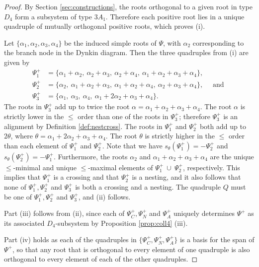 \documentclass[11pt]{amsart}
\theoremstyle{plain}
\theoremstyle{definition}
\theoremstyle{remark}
\numberwithin{equation}{subsection}
\newcommand{\al}{\alpha}
\begin{document}
\begin{proof}
By Section \ref{sec:constructions}, the roots orthogonal to a given root in type
$D_4$ form a subsystem of type $3A_1$. Therefore each positive root lies in a
unique quadruple of mutually orthogonal positive roots, which proves (i).

Let $\{\al_1,\al_2,\al_3,\al_4\}$ be the induced simple roots of $\Psi$, with
$\al_2$ corresponding to the branch node in the Dynkin diagram.  Then the three
quadruples from (i) are given by \begin{align*} \Psi^+_1 &= \{\al_1 + \al_2, \
    \al_2 + \al_3, \ \al_2 + \al_4, \ \al_1 + \al_2 + \al_3 + \al_4\}, \\
    \Psi^+_2 &= \{\al_2, \ \al_1 + \al_2 + \al_3, \ \al_1 + \al_2 + \al_4, \
    \al_2 + \al_3 + \al_4\}, \quad \text{\ and\ }\\ \Psi^+_3 &= \{\al_1, \
    \al_3, \ \al_4, \ \al_1 + 2\al_2 + \al_3 + \al_4\} .
\end{align*} The roots in $\Psi^+_3$ add up to twice the root $\al = \al_1 +
    \al_2 + \al_3 + \al_4$. The root $\al$ is strictly lower in the $\le$ order
    than one of the roots in $\Psi^+_3$; therefore $\Psi^+_3$ is an alignment by
    Definition \ref{def:nestcross}.  The roots in $\Psi^+_1$ and $\Psi^+_2$ both
    add up to $2 \theta$, where $\theta = \al_1 + 2\al_2 + \al_3 + \al_4$.  The
    root $\theta$ is strictly higher in the $\le$ order than each element of
    $\Psi^+_1$ and $\Psi^+_2$.  Note that we have $s_\theta(\Psi^+_1) =
    -\Psi^+_2$ and $s_\theta(\Psi^+_2) = -\Psi^+_1$.  Furthermore, the roots
    $\al_2$ and $\al_1 + \al_2 + \al_3 + \al_4$ are the unique $\leq$-minimal
    and unique $\leq$-maximal elements of $\Psi^+_1 \ \cup\ \Psi^+_2$,
    respectively. This implies that $\Psi^+_1$ is a crossing and that $\Psi^+_2$
    is a nesting, and it also follows that none of $\Psi^+_1, \Psi^+_2$ and
    $\Psi^+_3$ is both a crossing and a nesting. The quadruple $Q$ must be one
    of $\Psi^+_1, \Psi^+_2$ and $\Psi^+_3$, and (ii) follows.

Part (iii) follows from (ii), since each of  $\Psi^+_C, \Psi^+_N$ and $\Psi^+_A$
uniquely determines $\Psi^+$ as its associated $D_4$-subsystem by Proposition
\ref{prop:coll4} (iii).

Part (iv) holds as each of the quadruples in $\{\Psi^+_C, \Psi^+_N, \Psi^+_A\}$
is a basis for the span of $\Psi^+$, so that any root that is orthogonal to
every element of one quadruple is also orthogonal to every element of each of
the other quadruples.


\end{proof}
\end{document}

